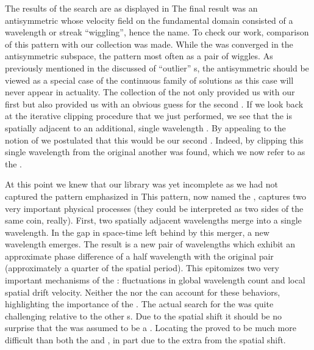 The results of the {\wiggle} search are as displayed in %
The final result was an antisymmetric {\fpo} whose velocity field on
the fundamental domain consisted of a wavelength or streak ``wiggling'', hence the name.
To check our work, comparison of this pattern with our {\po} collection was made.
While the {\wiggle} was converged in the antisymmetric subspace, the
pattern most often as a pair of wiggles.
As previously mentioned in the discussed of ``outlier'' {\po}s, the antisymmetric {\wiggle}
should be viewed as a special case of the continuous family of {\wiggle} solutions as
this case will never appear in actuality.
The collection of the {\wiggle} not only provided us with our first {\fpo} but also
provided us with an obvious guess for the second {\fpo}. If we look back
at the iterative clipping procedure that we just performed, %
we see that the {\wiggle} is spatially adjacent to an additional,
single wavelength {\eqv}. %
By appealing to the notion of {\spt} {\symbolic} we postulated that
this {\eqv} would be our second {\fpo}. Indeed, by clipping this
single wavelength {\eqv} from the original {\po} another {\fpo} was found,
which we now refer to as the {\streak}.

At this point we knew that our library was yet incomplete as we had not
captured the pattern emphasized in %
This pattern, now named the {}, captures two very important physical processes (they
could be interpreted as two sides of the same coin, really). First, two spatially adjacent
wavelengths merge into a single wavelength. In the gap in space-time left behind by this
merger, a new wavelength emerges. The result is a new pair of wavelengths which
exhibit an approximate phase difference of a
half wavelength with the original pair (approximately a quarter of
the spatial period).
This {} epitomizes two very important mechanisms of the \KSe:
fluctuations in global wavelength count and local spatial drift velocity.
Neither the {\streak} nor the {\wiggle} can account for
these behaviors, highlighting the importance of the {}.
The actual search for the {} was quite challenging relative to the other
{\fpo}s. Due to the spatial
shift it should be no surprise that the {\fpo} was assumed to be a {\rpo}.
Locating the {} proved to be much more difficult than both the {\wiggle}
and {\streak}, in part due to the extra {\cdof} from the spatial shift.

